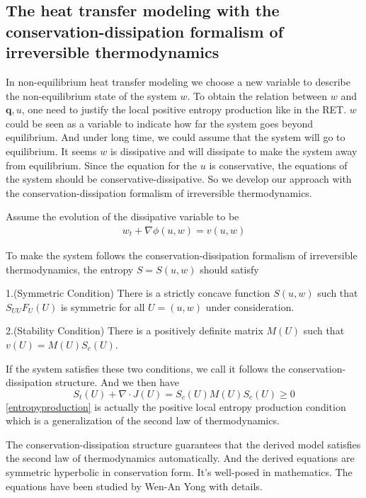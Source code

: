 \documentclass[a4paper]{article}
\begin{document}
\subsection{The  heat transfer modeling with the conservation-dissipation formalism of irreversible thermodynamics}
In non-equilibrium heat transfer modeling we choose a new variable to describe the non-equilibrium state of the system $w$. To obtain the relation between $w$ and $\mathbf{q},u$, one need to justify the local positive entropy production like in the RET. $w$ could be seen as a variable to indicate how far the system goes beyond equilibrium. And under long time, we could assume that the system will go to equilibrium. It seems $w$ is dissipative and will dissipate to make the system away from equilibrium. Since the equation for the $u$ is conservative, the equations of the system should be conservative-dissipative. So we develop our approach with the conservation-dissipation formalism of irreversible thermodynamics.

Assume the evolution of the dissipative variable to be
\begin{eqnarray}
w_t+\nabla \phi(u,w)=v(u,w)
\end{eqnarray}

To make the system follows the conservation-dissipation formalism of irreversible thermodynamics, the entropy $S = S(u,w)$ should satisfy

1.(Symmetric Condition) There is a strictly concave function $S(u,w)$ such that $S_{UU} F_U(U)$ is symmetric for all $U=(u,w)$ under consideration.

2.(Stability Condition) There is a positively definite matrix $M(U)$ such that $v(U)=M(U)S_c(U)$.

If the system satisfies these two conditions, we call it follows the conservation-dissipation structure. And we then have
\begin{equation}\label{entropyproduction}
S_t(U)+\nabla \cdot J(U)=S_c(U)M(U)S_c(U) \ge 0
\end{equation}
\eqref{entropyproduction} is actually the positive local entropy production condition which is a generalization of the second law of thermodynamics.

The  conservation-dissipation structure guarantees that the derived model satisfies the second law of thermodynamics automatically. And the derived equations are symmetric hyperbolic in conservation form. It's well-posed in mathematics\cite{friedrichs1971systems}. The equations have been studied by Wen-An Yong with details\cite{yong2008interesting,yong1999singular,kawashima2004dissipative}.
\end{document}
